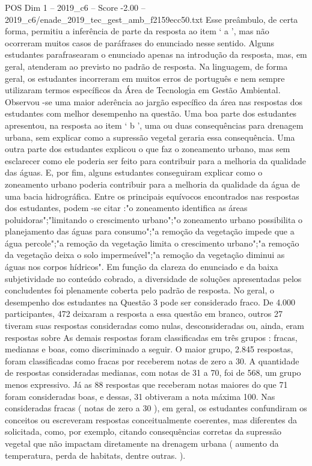 \begin{textsample}{POS Dim 1 – 2019\_c6 – Score -2.00 – 2019\_c6/enade\_2019\_tec\_gest\_amb\_f2159ecc50.txt}
Esse preâmbulo, de certa forma, permitiu a inferência de parte da resposta ao item ‘ a ’, mas não ocorreram muitos casos de paráfrases do enunciado nesse sentido.
Alguns estudantes parafrasearam o enunciado apenas na introdução da resposta, mas, em geral, atenderam ao previsto no padrão de resposta.
Na linguagem, de forma geral, os estudantes incorreram em muitos erros de português e nem sempre utilizaram termos específicos da Área de Tecnologia em Gestão Ambiental.
Observou -se uma maior aderência ao jargão específico da área nas respostas dos estudantes com melhor desempenho na questão.
Uma boa parte dos estudantes apresentou, na resposta ao item ‘ b ’, uma ou duas consequências para drenagem urbana, sem explicar como a supressão vegetal geraria essa consequência.
Uma outra parte dos estudantes explicou o que faz o zoneamento urbano, mas sem esclarecer como ele poderia ser feito para contribuir para a melhoria da qualidade das águas.
E, por fim, alguns estudantes conseguiram explicar como o zoneamento urbano poderia contribuir para a melhoria da qualidade da água de uma bacia hidrográfica.
Entre os principais equívocos encontrados nas respostas dos estudantes, podem -se citar :"o zoneamento identifica as áreas poluidoras";"limitando o crescimento urbano";"o zoneamento urbano possibilita o planejamento das águas para consumo";"a remoção da vegetação impede que a água percole";"a remoção da vegetação limita o crescimento urbano";"a remoção da vegetação deixa o solo impermeável";"a remoção da vegetação diminui as águas nos corpos hídricos".
Em função da clareza do enunciado e da baixa subjetividade no conteúdo cobrado, a diversidade de soluções apresentadas pelos concludentes foi plenamente coberta pelo padrão de resposta.
No geral, o desempenho dos estudantes na Questão 3 pode ser considerado fraco.
De 4.000 participantes, 472 deixaram a resposta a essa questão em branco, outros 27 tiveram suas respostas consideradas como nulas, desconsideradas ou, ainda, eram respostas sobre As demais respostas foram classificadas em três grupos : fracas, medianas e boas, como discriminado a seguir.
O maior grupo, 2.845 respostas, foram classificadas como fracas por receberem notas de zero a 30.
A quantidade de respostas consideradas medianas, com notas de 31 a 70, foi de 568, um grupo menos expressivo.
Já as 88 respostas que receberam notas maiores do que 71 foram consideradas boas, e dessas, 31 obtiveram a nota máxima 100.
Nas consideradas fracas ( notas de zero a 30 ), em geral, os estudantes confundiram os conceitos ou escreveram respostas conceitualmente coerentes, mas diferentes da solicitada, como, por exemplo, citando consequências corretas da supressão vegetal que não impactam diretamente na drenagem urbana ( aumento da temperatura, perda de habitats, dentre outras. ).

\end{textsample}
